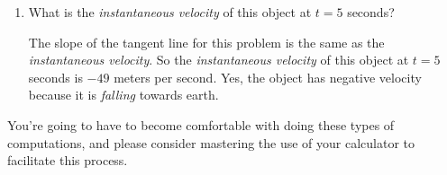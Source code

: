 \documentclass[12pt,addpoints, answers, fleqn]{exam}
\begin{document}
\begin{enumerate}
\item What is the \emph{instantaneous velocity} of this object at $t=5$ seconds?

\begin{solution}
The slope of the tangent line for this problem is the same as the \emph{instantaneous velocity}. So the \emph{instantaneous velocity} of this object at $t=5$ seconds is $-49$ meters per second. Yes, the object has negative velocity because it is \emph{falling} towards earth.
\end{solution}

\end{enumerate}

You're going to have to become comfortable with doing these types of computations, and please consider mastering the use of your calculator to facilitate this process.
\end{document}
